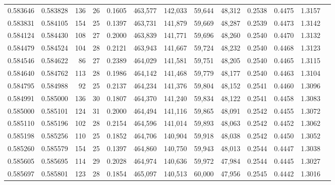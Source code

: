 \begin{tabular}{rrrrrrrrrrrrr}
0.583646 & 0.583828 &    136 &    26 &                                     0.1605 & 463,577 & 142,033 &  59,644 &  48,312 & 0.2538 & 0.4475 & 1.3157 \\
0.583831 & 0.584105 &    154 &    25 &                                     0.1397 & 463,731 & 141,879 &  59,669 &  48,287 & 0.2539 & 0.4473 & 1.3142 \\
0.584124 & 0.584430 &    108 &    27 &                                     0.2000 & 463,839 & 141,771 &  59,696 &  48,260 & 0.2540 & 0.4470 & 1.3132 \\
0.584479 & 0.584524 &    104 &    28 &                                     0.2121 & 463,943 & 141,667 &  59,724 &  48,232 & 0.2540 & 0.4468 & 1.3123 \\
0.584546 & 0.584622 &     86 &    27 &                                     0.2389 & 464,029 & 141,581 &  59,751 &  48,205 & 0.2540 & 0.4465 & 1.3115 \\
0.584640 & 0.584762 &    113 &    28 &                                     0.1986 & 464,142 & 141,468 &  59,779 &  48,177 & 0.2540 & 0.4463 & 1.3104 \\
0.584795 & 0.584988 &     92 &    25 &                                     0.2137 & 464,234 & 141,376 &  59,804 &  48,152 & 0.2541 & 0.4460 & 1.3096 \\
0.584991 & 0.585000 &    136 &    30 &                                     0.1807 & 464,370 & 141,240 &  59,834 &  48,122 & 0.2541 & 0.4458 & 1.3083 \\
0.585000 & 0.585101 &    124 &    31 &                                     0.2000 & 464,494 & 141,116 &  59,865 &  48,091 & 0.2542 & 0.4455 & 1.3072 \\
0.585110 & 0.585196 &    102 &    28 &                                     0.2154 & 464,596 & 141,014 &  59,893 &  48,063 & 0.2542 & 0.4452 & 1.3062 \\
0.585198 & 0.585256 &    110 &    25 &                                     0.1852 & 464,706 & 140,904 &  59,918 &  48,038 & 0.2542 & 0.4450 & 1.3052 \\
0.585260 & 0.585579 &    154 &    25 &                                     0.1397 & 464,860 & 140,750 &  59,943 &  48,013 & 0.2544 & 0.4447 & 1.3038 \\
0.585605 & 0.585695 &    114 &    29 &                                     0.2028 & 464,974 & 140,636 &  59,972 &  47,984 & 0.2544 & 0.4445 & 1.3027 \\
0.585697 & 0.585801 &    123 &    28 &                                     0.1854 & 465,097 & 140,513 &  60,000 &  47,956 & 0.2545 & 0.4442 & 1.3016 \\

\end{tabular}
